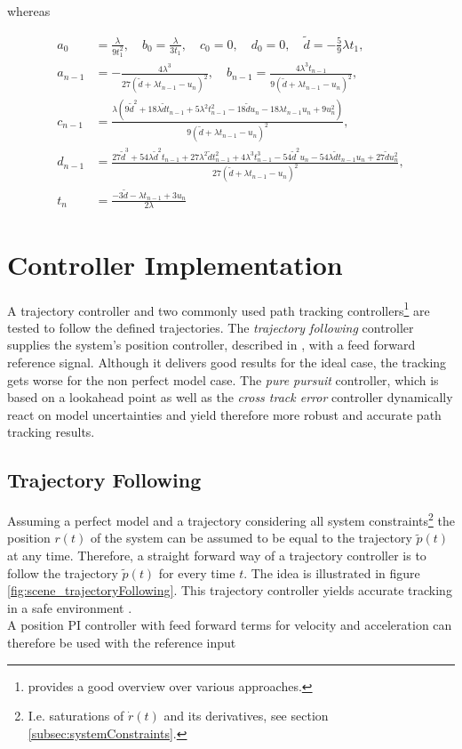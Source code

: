 whereas

\begin{align*}
a_0 &= \frac{\lambda}{9t_1^2} , \quad
b_0 = \frac{\lambda}{3t_1} , \quad
c_0 = 0 , \quad
d_0 = 0 , \quad
\tilde{d} = - \frac{5}{9}\lambda t_1 , \\
a_{n-1} &= -\frac{4 \lambda^3}{27 (\tilde{d} + \lambda t_{n-1} - u_n)^2} , \quad
b_{n-1} = \frac{4 \lambda^3 t_{n-1}}{9 (\tilde{d} + \lambda t_{n-1} - u_n)^2} , \\
c_{n-1} &= \frac{\lambda (9 \tilde{d}^2 + 18 \lambda \tilde{d} t_{n-1} + 5 \lambda^2 t_{n-1}^2 - 18 \tilde{d} u_n - 18 \lambda t_{n-1} u_n + 
   9 u_n^2)}{9 (\tilde{d} + \lambda t_{n-1} - u_n)^2} , \\
d_{n-1} &= \frac{27 \tilde{d}^3 + 54 \lambda \tilde{d}^2 t_{n-1} + 27 \lambda^2 \tilde{d} t_{n-1}^2 + 4 \lambda^3 t_{n-1}^3 - 
 54 \tilde{d}^2 u_n - 54 \lambda \tilde{d} t_{n-1} u_n + 27 \tilde{d} u_n^2}{27 (\tilde{d} + \lambda t_{n-1} - u_n)^2} , \\
t_n &= \frac{-3 \tilde{d} - \lambda t_{n-1} + 3 u_n}{2 \lambda}
\end{align*}

\pagebreak
\section{Controller Implementation}
\label{sec:controllerImplementation}
A trajectory controller and two commonly used path tracking controllers\footnote{\cite{snider} provides a good overview over various approaches.} are tested to follow the defined trajectories. The \textit{trajectory following} controller supplies the system's position controller, described in \cite{meiermueri}, with a feed forward reference signal. Although it delivers good results for the ideal case, the tracking gets worse for the non perfect model case. The \textit{pure pursuit} controller, which is based on a lookahead point as well as the \textit{cross track error} controller dynamically react on model uncertainties and yield therefore more robust and accurate path tracking results.

\subsection{Trajectory Following}
Assuming a perfect model and a trajectory considering all system constraints\footnote{I.e. saturations of $\dot{r}(t)$ and its derivatives, see section \ref{subsec:systemConstraints}.} the position $r\left(t\right)$ of the system can be assumed to be equal to the trajectory $\tilde{p}(t)$ at any time. Therefore, a straight forward way of a trajectory controller is to follow the trajectory $\tilde{p}(t)$ for every time $t$. The idea is illustrated in figure \ref{fig:scene_trajectoryFollowing}. This trajectory controller yields accurate tracking in a safe environment \cite{doessegger}.
\\
A position PI controller with feed forward terms for velocity and acceleration can therefore be used with the reference input


